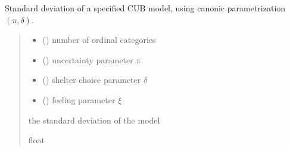 \documentclass[letterpaper,10pt,english]{sphinxmanual}
\begin{document}

\begin{fulllineitems}
\label{\detokenize{cubmods:cubmods.cubsh.std_delta}}
\pysigstartsignatures
{}
\pysigstopsignatures
\sphinxAtStartPar
Standard deviation of a specified CUB model,
using canonic parametrization \((\pi, \delta)\).
\begin{quote}\begin{description}
\begin{itemize}
\item {} 
\sphinxAtStartPar
{} () \textendash{} number of ordinal categories

\item {} 
\sphinxAtStartPar
{} () \textendash{} uncertainty parameter \(\pi\)

\item {} 
\sphinxAtStartPar
{} () \textendash{} shelter choice parameter \(\delta\)

\item {} 
\sphinxAtStartPar
{} () \textendash{} feeling parameter \(\xi\)

\end{itemize}

\sphinxAtStartPar
the standard deviation of the model

\sphinxAtStartPar
float

\end{description}\end{quote}

\end{fulllineitems}

\end{document}
